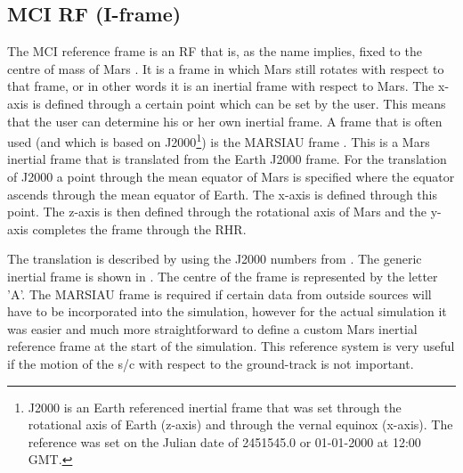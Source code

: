 \subsection{\acl{MCI} \ac{RF} (I-frame)}
\label{subsec:ECI}
The \acf{MCI} reference frame is an \ac{RF} that is, as the name implies, fixed to the centre of mass of Mars \citep{mooij2013fd}. It is a frame in which Mars still rotates with respect to that frame, or in other words it is an inertial frame with respect to Mars. The x-axis is defined through a certain point which can be set by the user. This means that the user can determine his or her own inertial frame. A frame that is often used (and which is based on J2000\footnote{J2000 is an Earth referenced inertial frame that was set through the rotational axis of Earth (z-axis) and through the vernal equinox (x-axis). The reference was set on the Julian date of 2451545.0 or 01-01-2000 at 12:00 \ac{GMT}.}) is the MARSIAU frame \citep{bachman2014naif,diaz2008generic}. This is a Mars inertial frame that is translated from the Earth J2000 frame. For the translation of J2000 a point through the mean equator of Mars is specified where the equator ascends through the mean equator of Earth. The x-axis is defined through this point. The z-axis is then defined through the rotational axis of Mars and the y-axis completes the frame through the \ac{RHR}. 

The translation is described by \cite{bachman2014naif,diaz2008generic} using the J2000 numbers from \cite{archinal2011report}. The generic inertial frame is shown in . The centre of the frame is represented by the letter 'A'. The MARSIAU frame is required if certain data from outside sources will have to be incorporated into the simulation, however for the actual simulation it was easier and much more straightforward to define a custom Mars inertial reference frame at the start of the simulation. This reference system is very useful if the motion of the \ac{s/c} with respect to the ground-track is not important.





